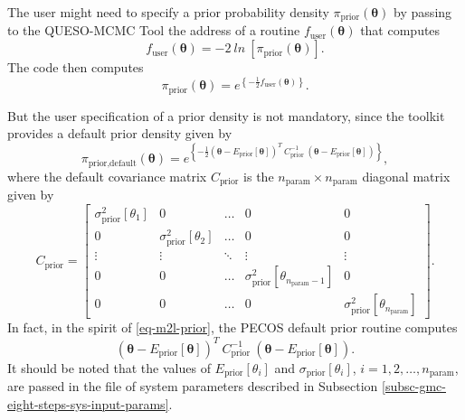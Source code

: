 The user might need to specify a prior probability density $\pi_{\text{prior}}(\boldsymbol{\theta})$
by passing to the QUESO-MCMC Tool the address of a routine $f_{\text{user}}(\boldsymbol{\theta})$ that computes
\begin{equation}\label{eq-m2l-prior}
f_{\text{user}}(\boldsymbol{\theta})=
-2~ln~
\left[
\pi_{\text{prior}}(\boldsymbol{\theta})
\right].
\end{equation}
The code then computes
\begin{equation*}
\pi_{\text{prior}}(\boldsymbol{\theta}) = e^
{
\left\{
-\frac{1}{2}
f_{\text{user}}(\boldsymbol{\theta})
\right\}
}.
\end{equation*}

But the user specification of a prior density is not mandatory, since the toolkit provides a default prior density given by
\begin{equation*}
\pi_{\text{prior,default}}(\boldsymbol{\theta}) =
e^{
\left\{
-\frac{1}{2}
(\boldsymbol{\theta}-E_{\text{prior}}[\boldsymbol{\theta}])^T
~C_{\text{prior}}^{-1}~
(\boldsymbol{\theta}-E_{\text{prior}}[\boldsymbol{\theta}])
\right\}
},
\end{equation*}
where the default covariance matrix $C_{\text{prior}}$ is the $n_{\text{param}}\times n_{\text{param}}$ diagonal matrix given by
\begin{equation}\label{eq-default-prior-cov-matrix}
C_{\text{prior}} =
\left[
\begin{array}{cccccc}
\sigma_{\text{prior}}^2[\theta_1] & 0                                 & \ldots & 0                                                  & 0      \\
0                                 & \sigma_{\text{prior}}^2[\theta_2] & \ldots & 0                                                  & 0      \\
\vdots                            & \vdots                            & \ddots & \vdots                                             & \vdots \\
0                                 & 0                                 & \ldots & \sigma_{\text{prior}}^2[\theta_{n_{\text{param}}-1}] & 0      \\
0                                 & 0                                 & \ldots & 0                                                  & \sigma_{\text{prior}}^2[\theta_{n_{\text{param}}}]
\end{array}
\right].
\end{equation}
In fact, in the spirit of \eqref{eq-m2l-prior}, the PECOS default prior routine computes
\begin{equation*}
(\boldsymbol{\theta}-E_{\text{prior}}[\boldsymbol{\theta}])^T
~C_{\text{prior}}^{-1}~
(\boldsymbol{\theta}-E_{\text{prior}}[\boldsymbol{\theta}]).
\end{equation*}
It should be noted that the values of $E_{\text{prior}}[\theta_i]$ and $\sigma_{\text{prior}}[\theta_i]$, $i=1,2,\ldots,n_{\text{param}}$,
are passed in the file of system parameters described in Subsection \ref{subsc-gmc-eight-steps-sys-input-params}.

